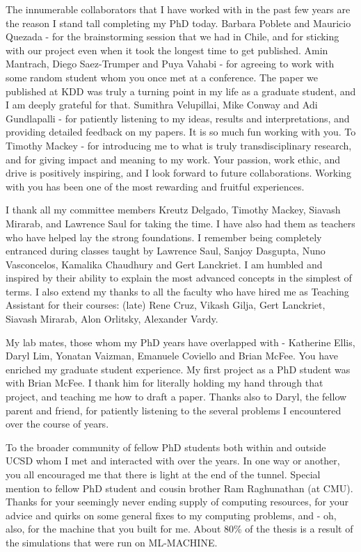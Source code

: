 \begin{frontmatter}
\begin{acknowledgements}
The innumerable collaborators that I have worked with in the past few years are the reason I stand tall completing my PhD today.  Barbara Poblete and Mauricio Quezada - for the brainstorming session that we had in Chile, and for sticking with our project even when it took the longest time to get published.  Amin Mantrach, Diego Saez-Trumper and Puya Vahabi - for agreeing to work with some random student whom you once met at a conference.  The paper we published at KDD was truly a turning point in my life as a graduate student, and I am deeply grateful for that.  Sumithra Velupillai, Mike Conway and Adi Gundlapalli - for patiently listening to my ideas, results and interpretations, and providing detailed feedback on my papers.  It is so much fun working with you.  To Timothy Mackey - for introducing me to what is truly transdisciplinary research, and for giving impact and meaning to my work.  Your passion, work ethic, and drive is positively inspiring, and I look forward to future collaborations.  Working with you has been one of the most rewarding and fruitful experiences.

I thank all my committee members Kreutz Delgado, Timothy Mackey, Siavash Mirarab, and Lawrence Saul for taking the time.  I have also had them as teachers who have helped lay the strong foundations.  I remember being completely entranced during classes taught by Lawrence Saul, Sanjoy Dasgupta, Nuno Vasconcelos, Kamalika Chaudhury and Gert Lanckriet.  I am humbled and inspired by their ability to explain the most advanced concepts in the simplest of terms.  I also extend my thanks to all the faculty who have hired me as Teaching Assistant for their courses:  (late) Rene Cruz, Vikash Gilja, Gert Lanckriet, Siavash Mirarab, Alon Orlitsky, Alexander Vardy.  

My lab mates, those whom my PhD years have overlapped with - Katherine Ellis, Daryl Lim, Yonatan Vaizman, Emanuele Coviello and Brian McFee.  You have enriched my graduate student experience.  My first project as a PhD student was with Brian McFee.  I thank him for literally holding my hand through that project, and teaching me how to draft a paper.  Thanks also to Daryl, the fellow parent and friend, for patiently listening to the several problems I encountered over the course of years.  

To the broader community of fellow PhD students both within and outside UCSD whom I met and interacted with over the years.  In one way or another, you all encouraged me that there is light at the end of the tunnel.  Special mention to fellow PhD student and cousin brother Ram Raghunathan (at CMU).  Thanks for your seemingly never ending supply of computing resources, for your advice and quirks on some general fixes to my computing problems, and - oh, also, for the machine that you built for me.  About 80\% of the thesis is a result of the simulations that were run on ML-MACHINE.  


\end{acknowledgements}
\end{frontmatter}
